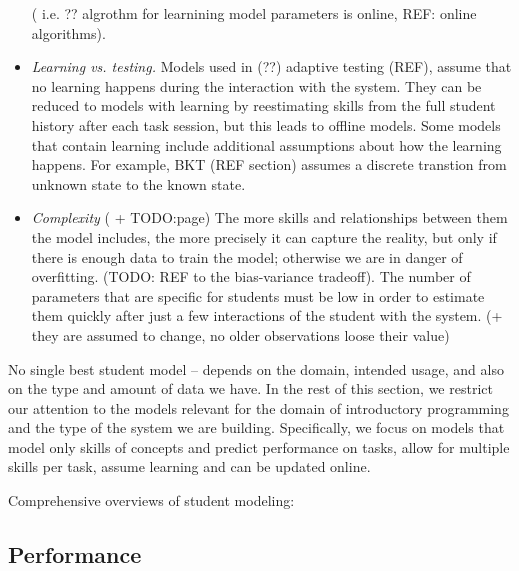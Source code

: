 \begin{itemize}
( i.e. ?? algrothm for learnining model parameters is online, REF: online algorithms).
\item \emph{Learning vs. testing.}
Models used in (??) adaptive testing (REF), assume that no learning happens
during the interaction with the system. They can be reduced to models with
learning by reestimating skills from the full student history after each task
session, but this leads to offline models.
Some models that contain learning include additional assumptions
about how the learning happens. For example, BKT (REF section)
assumes a discrete transtion from unknown state to the known state.
\item \emph{Complexity} (\cite{pelanek-learner-modeling} + TODO:page)
The more skills and relationships between them the model includes,
the more precisely it can capture the reality, but only
if there is enough data to train the model; otherwise we are in danger of
overfitting. (TODO: REF to the bias-variance tradeoff).
The number of parameters that are specific for students must be low in order to
estimate them quickly after just a few interactions of the student with the system.
(+ they are assumed to change, no older observations loose their value)
\end{itemize}

No single best student model -- depends on the domain, intended usage, and also
on the type and amount of data we have.
In the rest of this section, we restrict our attention to the models relevant
for the domain of introductory programming and the type of the system we
are building. Specifically, we focus on models that
model only skills of concepts and predict performance on tasks,
allow for multiple skills per task,
assume learning and can be updated online.

Comprehensive overviews of student modeling:
\cite{its-learner-models, student-models-review-2012, pelanek-learner-modeling}

\subsection{Performance}

